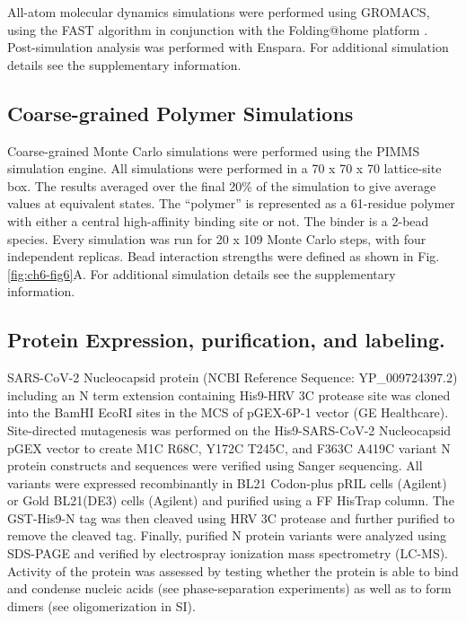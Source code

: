 \documentclass[../main.tex]{subfiles}
\begin{document}
        All-atom molecular dynamics simulations were performed using GROMACS, using the FAST algorithm in conjunction with the Folding@home platform \cite{Shirts:2000du,Abraham:2015gj,zimmerman_fast_2015}. Post-simulation analysis was performed with Enspara\cite{porter2018enspara}. For additional simulation details see the supplementary information.  

    \subsection{Coarse-grained Polymer Simulations}
        Coarse-grained Monte Carlo simulations were performed using the PIMMS simulation engine\cite{Holehouse2019-cj}. All simulations were performed in a 70 x 70 x 70 lattice-site box. The results averaged over the final 20\% of the simulation to give average values at equivalent states. The “polymer” is represented as a 61-residue polymer with either a central high-affinity binding site or not. The binder is a 2-bead species. Every simulation was run for 20 x 109 Monte Carlo steps, with four independent replicas. Bead interaction strengths were defined as shown in Fig. \ref{fig:ch6-fig6}A. For additional simulation details see the supplementary information.

    \subsection{Protein Expression, purification, and labeling.}
        SARS-CoV-2 Nucleocapsid protein (NCBI Reference Sequence: YP\_009724397.2) including an N term extension containing His9-HRV 3C protease site was cloned into the BamHI EcoRI sites in the MCS of pGEX-6P-1 vector (GE Healthcare). Site-directed mutagenesis was performed on the His9-SARS-CoV-2 Nucleocapsid pGEX vector to create M1C R68C, Y172C T245C, and F363C A419C variant N protein constructs and sequences were verified using Sanger sequencing. All variants were expressed recombinantly in BL21 Codon-plus pRIL cells (Agilent) or Gold BL21(DE3) cells (Agilent) and purified using a FF HisTrap column. The GST-His9-N tag was then cleaved using HRV 3C protease and further purified to remove the cleaved tag. Finally, purified N protein variants were analyzed using SDS-PAGE and verified by electrospray ionization mass spectrometry (LC-MS). Activity of the protein was assessed by testing whether the protein is able to bind and condense nucleic acids (see phase-separation experiments) as well as to form dimers (see oligomerization in SI).
\end{document}
